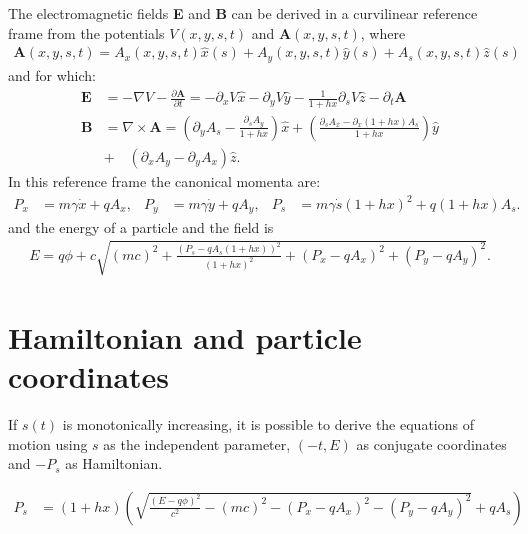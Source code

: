 The electromagnetic fields {\bf E} and {\bf B} can be derived in a curvilinear
reference frame from the potentials $V(x,y,s,t)$ and $\mathbf{A}(x,y,s,t)$, where
\begin{align}
\mathbf{A}(x,y,s,t)=A_x(x,y,s,t) \hat x(s) + A_y(x,y,s,t) \hat y(s) + A_s(x,y,s,t) \hat z(s)
\end{align}
and for which:
\begin{align}
  \mathbf{E}  &= -\nabla V - \frac{\partial \mathbf{A}}{\partial t} 
               = -\partial_x V \hat x - \partial_y V \hat y -
  \frac{1}{1+h x}  \partial_s V \hat z - \partial_t \mathbf{A}\\
  \mathbf{B} &= \nabla\times\mathbf{A}  =
  \left(\partial_y A_s - \frac{\partial_s  A_y}{1+h x} \right) \hat x 
  +\left(\frac{\partial_s A_x-\partial_x (1+h x) A_s }{1+h x} \right)\hat y \\
  &+\quad \left(\partial_x A_y - \partial_y A_x \right) \hat z.
\end{align}
In this reference frame the canonical momenta are:
\begin{align}
  P_x&=m \gamma \dot x + q A_x, &
  P_y&=m \gamma \dot y + q A_y, &
  P_s&=m \gamma \dot s (1 + h x)^2 + q (1 + h x) A_s.
\end{align}
and the energy of a particle and the field is
\begin{align}
E=q\phi + c \sqrt{(mc)^2
              +\frac{(P_s- q A_s(1+hx))^2}{(1+hx)^2}
              +(P_x-q A_x)^2 + (P_y-q A_y)^2}.
\end{align}







\section{Hamiltonian and particle coordinates}

If $s(t)$ is monotonically increasing, it is possible to derive the equations
of motion using $s$ as the independent parameter, $(-t, E)$ as conjugate coordinates and $-P_s$ as Hamiltonian.

\begin{align}
  P_s&= (1+h x) \left( 
       \sqrt{ \frac{(E-q\phi)^2}{c^2} - (mc)^2
           - (P_x - q A_x)^2
           - (P_y - q A_y)^2}
       +q A_s
    \right)
\end{align}

